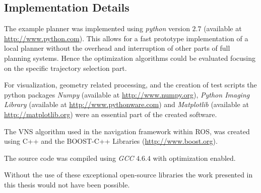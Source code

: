 \subsection{Implementation Details}
The example planner was implemented using \emph{python} version $2.7$ (available at \url{http://www.python.com}). This allows for a fast prototype implementation of a local planner without the overhead and interruption of other parts of full planning systems.
Hence the optimization algorithms could be evaluated focusing on the  specific trajectory selection part. 

For visualization, geometry related processing, and the creation of test scripts the python packages \emph{Numpy} (available at \url{http://www.numpy.org}), \emph{Python Imaging Library} (available at \url{http://www.pythonware.com}) and \emph{Matplotlib} (available at \url{http://matplotlib.org}) were an essential part of the created software. 

The VNS algorithm used in the navigation framework within ROS, was created using C++ and the BOOST-C++ Libraries (\url{http://www.boost.org}).

The source code was compiled using \emph{GCC} $4.6.4$ with optimization enabled.

Without the use of these exceptional open-source libraries the work presented in this thesis would not have been possible.  

 

